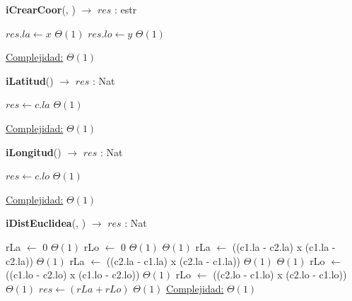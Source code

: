 \begin{Algoritmos}

\medskip
	
  	\medskip
  
\begin{algorithm}[H]{\textbf{iCrearCoor}(, ) $\to$ $res$ : estr}
    	\begin{algorithmic}[1]
			\State $res.la \gets x$ \Comment $\Theta(1)$
			\State $res.lo \gets y$ \Comment $\Theta(1)$
			
			\medskip
			\Statex \underline{Complejidad:} $\Theta(1)$
    	\end{algorithmic}
\end{algorithm}

\begin{algorithm}[H]{\textbf{iLatitud}() $\to$ $res$ : Nat}
    	\begin{algorithmic}[1]
			\State $res \gets c.la$ \Comment $\Theta(1)$
			
			\medskip
			\Statex \underline{Complejidad:} $\Theta(1)$
    	\end{algorithmic}
\end{algorithm}

\begin{algorithm}[H]{\textbf{iLongitud}() $\to$ $res$ : Nat}
    	\begin{algorithmic}[1]
			\State $res \gets c.lo$ \Comment $\Theta(1)$
			
			\medskip
			\Statex \underline{Complejidad:} $\Theta(1)$
    	\end{algorithmic}
\end{algorithm}

\begin{algorithm}[H]{\textbf{iDistEuclidea}(, ) $\to$ $res$ : Nat}
    	\begin{algorithmic}[1]
			\State rLa $\gets$ 0	\Comment $\Theta(1)$
			\State rLo $\gets$ 0	\Comment $\Theta(1)$
				\Comment $\Theta(1)$
				\State rLa $\gets$ ((c1.la - c2.la) x (c1.la - c2.la))	\Comment $\Theta(1)$
			\Else
				\State rLa $\gets$ ((c2.la - c1.la) x (c2.la - c1.la))	\Comment $\Theta(1)$
			\EndIf
				\Comment $\Theta(1)$
				\State rLo $\gets$ ((c1.lo - c2.lo) x (c1.lo - c2.lo))	\Comment $\Theta(1)$
			\Else
				\State rLo $\gets$ ((c2.lo - c1.lo) x (c2.lo - c1.lo))	\Comment $\Theta(1)$
			\EndIf
			\State $res \gets (rLa + rLo)$	\Comment $\Theta(1)$
			\medskip
			\Statex \underline{Complejidad:} $\Theta(1)$
    	\end{algorithmic}
\end{algorithm}


\end{Algoritmos}
